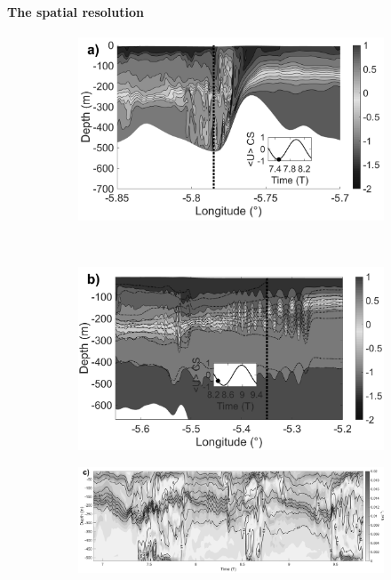 \paragraph{The spatial resolution}%
\label{TestNum}

\begin{figure}[!t]
   
   \centering
  \begin{subfigure}{0.5\linewidth}
  \includegraphics[width=\textwidth]{./papier2D/RW_J3_21h_50mtvd.png}
  \end{subfigure}
  ~
  \begin{subfigure}{0.5\linewidth}
  \includegraphics[width=\textwidth]{./papier2D/RW_J4_7h15train_50mtvd.png}
  \end{subfigure}
  
  \begin{subfigure}{1\linewidth}
  \includegraphics[width=\textwidth]{./papier2D/NrhoTZ_50mNH_5785.png}
  \end{subfigure}
     

\end{figure}
